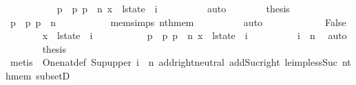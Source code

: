\begin{isabellebody}
\ \ \ \ \ \ \ \ \isamarkupfalse%
\ {\isacharasterisk}\ {\isacharbackquoteopen}p{}\ {\isacharless}\ p{}{\isacharbackquoteclose}\ {\isacharbackquoteopen}p{}\ {\isasymle}\ n{\isacharbackquoteclose}\ {\isacharbackquoteopen}x\ {\isasymin}\ l{\isacharunderscore}state\ {\isacharbang}\ i{\isacharbackquoteclose}\isanewline
\ \ \ \ \ \ \ \ \isamarkupfalse%
\ auto\isanewline
\ \ \ \ \ \ \isamarkupfalse%
\ {\isacharquery}thesis\isanewline
\ \ \ \ \ \ \ \ \isamarkupfalse%
\ {\isacharbackquoteopen}p{}\ {\isacharless}\ p{}{\isacharbackquoteclose}\ {\isacharbackquoteopen}p{}\ {\isasymle}\ n{\isacharbackquoteclose}\isanewline
\ \ \ \ \ \ \ \ \isamarkupfalse%
\ {\isachardoublequoteopen}{\isacharasterisk}{\isachardoublequoteclose}{\isacharparenleft}{}{\isacharparenright}\ mem{\isacharunderscore}simps{\isacharparenleft}{}{\isacharparenright}\ nth{\isacharunderscore}mem\isanewline
\ \ \ \ \ \ \ \ \isamarkupfalse%
\ auto\isanewline
\ \ \ \ \isamarkupfalse%
\isanewline
\ \ \ \ \ \ \isamarkupfalse%
\ False\isanewline
\ \ \ \ \ \ \isamarkupfalse%
\ {\isachardoublequoteopen}x\ {\isasymin}\ l{\isacharunderscore}state{\isacharprime}\ {\isacharbang}\ i{\isachardoublequoteclose}\isanewline
\ \ \ \ \ \ \ \ \isamarkupfalse%
\ {\isacharasterisk}\ {\isacharbackquoteopen}p{}\ {\isacharless}\ p{}{\isacharbackquoteclose}\ {\isacharbackquoteopen}p{}\ {\isasymle}\ n{\isacharbackquoteclose}\ {\isacharbackquoteopen}x\ {\isasymin}\ l{\isacharunderscore}state\ {\isacharbang}\ i{\isacharbackquoteclose}\isanewline
\ \ \ \ \ \ \ \ \isamarkupfalse%
\ {\isacartoucheopen}i\ {\isasymle}\ n{\isacartoucheclose}\ \isamarkupfalse%
\ auto\isanewline
\ \ \ \ \ \ \isamarkupfalse%
\ {\isacharquery}thesis\isanewline
\ \ \ \ \ \ \ \ \isamarkupfalse%
\ {\isacharparenleft}metis\ {\isachardoublequoteopen}{\isacharasterisk}{\isachardoublequoteclose}{\isacharparenleft}{}{\isacharparenright}\ One{\isacharunderscore}nat{\isacharunderscore}def\ Sup{\isacharunderscore}upper\ {\isacartoucheopen}i\ {\isasymle}\ n{\isacartoucheclose}\ add{\isachardot}right{\isacharunderscore}neutral\ add{\isacharunderscore}Suc{\isacharunderscore}right\ le{\isacharunderscore}imp{\isacharunderscore}less{\isacharunderscore}Suc\ nth{\isacharunderscore}mem\ subsetD{\isacharparenright}\isanewline

\end{isabellebody}
